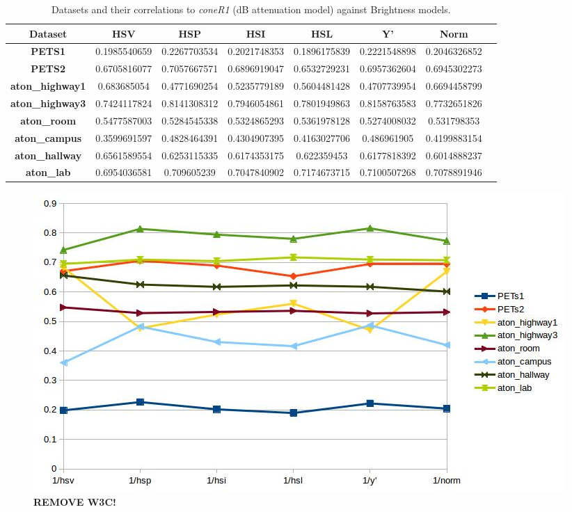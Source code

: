 \documentclass[12pt]{report}
\begin{document}
\begin{table}
\begin{tabular}{ |c|c|c|c|c|c|c|c| }
	\hline
	\textbf{Dataset} & \textbf{HSV} & \textbf{HSP} & \textbf{HSI} & \textbf{HSL}& \textbf{Y'} & \textbf{Norm} \\
	\hline
	\hline
	\textbf{PETS1} & 0.1985540659 & 0.2267703534 & 0.2021748353 & 0.1896175839 & 0.2221548898 & 0.2046326852 \\
	\hline
	\textbf{PETS2} & 0.6705816077 & 0.7057667571 & 0.6896919047 & 0.6532729231 & 0.6957362604 & 0.6945302273 \\
	\hline
	\textbf{aton\_highway1} & 0.683685054 & 0.4771690254 & 0.5235779189 & 0.5604481428 & 0.4707739954 & 0.6694458799 \\
	\hline
	\textbf{aton\_highway3} & 0.7424117824 & 0.8141308312 & 0.7946054861 & 0.7801949863 & 0.8158763583 & 0.7732651826 \\
	\hline
	\textbf{aton\_room} & 0.5477587003 & 0.5284545338 & 0.5324865293 & 0.5361978128 & 0.5274008032 & 0.531798353 \\
	\hline
	\textbf{aton\_campus} & 0.3599691597 & 0.4828464391 & 0.4304907395 & 0.4163027706 & 0.486961905	 & 0.4199883154 \\
	\hline
	\textbf{aton\_hallway} & 0.6561589554 & 0.6253115335 & 0.6174353175 & 0.622359453 & 0.6177818392 & 0.6014888237 \\
	\hline
	\textbf{aton\_lab} & 0.6954036581 & 0.709605239 & 0.7047840902 & 0.7174673715 & 0.7100507268 & 0.7078891946 \\
	\hline
\end{tabular}
\caption{Datasets and their correlations to \textit{coneR1} (dB attenuation model) against Brightness models.}
\label{table:brightness_corr_db}
\end{table}

\begin{figure}
  \includegraphics[width=\linewidth]{figures/brightness/db/correlation_x.jpg}
  \caption{\textbf{REMOVE W3C!}}
\label{fig:brightness_corr_db}
\end{figure}
\end{document}
